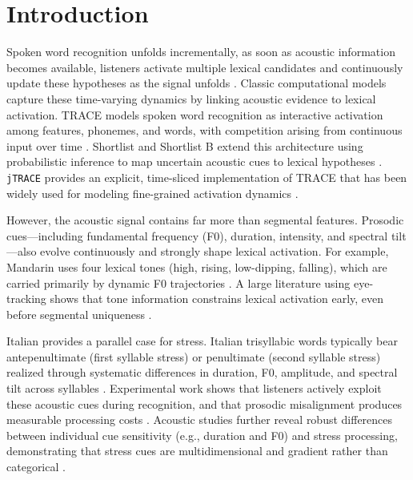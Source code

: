 \noindent\section{Introduction}

Spoken word recognition unfolds incrementally, as soon as acoustic information becomes available, listeners activate multiple lexical candidates and continuously update these hypotheses as the signal unfolds \cite{Allopenna1998,Tanenhaus1995,McMurrayAslin2005,ToscanoMcMurray2010,KuperbergJaeger2016}. Classic computational models capture these time-varying dynamics by linking acoustic evidence to lexical activation. TRACE models spoken word recognition as interactive activation among features, phonemes, and words, with competition arising from continuous input over time \cite{McClellandElman1986}. Shortlist and Shortlist B extend this architecture using probabilistic inference to map uncertain acoustic cues to lexical hypotheses \cite{Norris1994,NorrisMcQueen2008}. \texttt{jTRACE} provides an explicit, time-sliced implementation of TRACE that has been widely used for modeling fine-grained activation dynamics \cite{Strauss2007}.

However, the acoustic signal contains far more than segmental features. Prosodic cues---including fundamental frequency (F0), duration, intensity, and spectral tilt---also evolve continuously and strongly shape lexical activation. For example, Mandarin uses four lexical tones (high, rising, low-dipping, falling), which are carried primarily by dynamic F0 trajectories \cite{Yip2002, Xu1997}. A large literature using eye-tracking shows that tone information constrains lexical activation early, even before segmental uniqueness \cite{MalinsJoanisse2010,ShenFroud2019}. 

Italian provides a parallel case for stress. Italian trisyllabic words typically bear antepenultimate (first syllable stress) or penultimate (second syllable stress) realized through systematic differences in duration, F0, amplitude, and spectral tilt across syllables \cite{CutlerClifton1984}. Experimental work shows that listeners actively exploit these acoustic cues during recognition, and that prosodic misalignment produces measurable processing costs \cite{SulpizioMcQueen2012,Sulpizio2013}. Acoustic studies further reveal robust differences between individual cue sensitivity (e.g., duration and F0) and stress processing, demonstrating that stress cues are multidimensional and gradient rather than categorical \cite{BramlettWiener2025}.


